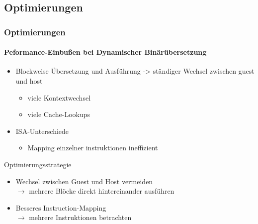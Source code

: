 \subsection{Optimierungen} %
\begin{frame}
	\frametitle{Optimierungen}
	\framesubtitle{Peformance-Einbußen bei Dynamischer Binärübersetzung}
	\begin{itemize}
		\item Blockweise Übersetzung und Ausführung -> ständiger Wechsel zwischen guest und host
		\begin{itemize}
			\item viele Kontextwechsel
			\item viele Cache-Lookups
		\end{itemize}
		\pause
		\item ISA-Unterschiede
		\begin{itemize}
			\item Mapping einzelner instruktionen ineffizient
		\end{itemize}
	\end{itemize}
	\pause
	\begin{block}{Optimierungsstrategie}
		\begin{itemize}
			\item Wechsel zwischen Guest und Host vermeiden \\
				$\rightarrow$ mehrere Blöcke direkt hintereinander ausführen
			\pause
			\item Besseres Instruction-Mapping \\
				$\rightarrow$ mehrere Instruktionen betrachten
		\end{itemize}
	\end{block}
\end{frame}


